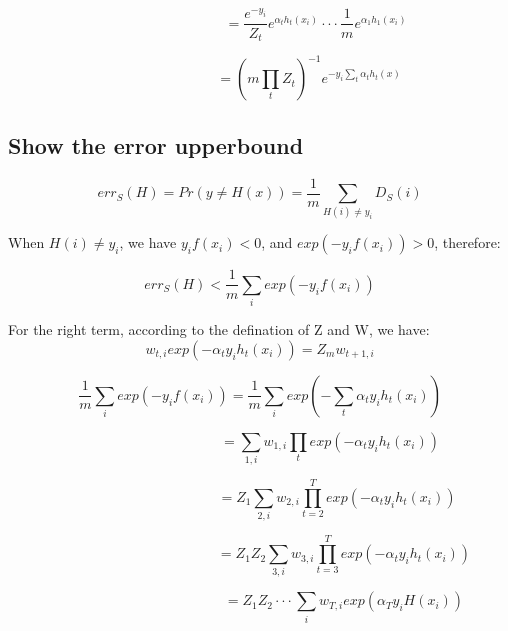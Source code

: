 \documentclass{article} %
\begin{document}
\begin{equation}
\qquad \qquad \qquad \qquad
= \frac{e^{-y_i}}{Z_t} e^{\alpha_t h_t (x_i)} \cdot \cdot \cdot
\frac{1}{m} e^{\alpha_1 h_1 (x_i)}
\end{equation}

\begin{equation}
\qquad \qquad \qquad \quad
= (m \prod_t Z_t)^{-1} e^{-y_i \sum_t \alpha_t h_t (x)}
\end{equation}


\subsection{Show the error upperbound}
\begin{equation}
err_S (H)= Pr (y \neq H (x)) =
\frac{1}{m} \sum_{H(i) \neq y_i} D_S (i)
\end{equation}

When $H(i) \neq y_i$, we have $y_i f(x_i) < 0$, and $exp(-y_i f(x_i)) > 0$,
therefore:

\begin{equation}
err_S (H) <
\frac{1}{m} \sum_i exp(-y_i f(x_i))
\end{equation}

For the right term, according to the defination of Z and W, we have:
\begin{equation}
w_{t,i} exp(-\alpha_t y_i h_t (x_i)) = Z_m w_{t+1,i}
\end{equation}

\begin{equation}
\frac{1}{m} \sum_i exp(-y_i f(x_i))
= \frac{1}{m} \sum_i exp (-\sum_t \alpha_t y_i h_t (x_i))
\end{equation}

\begin{equation}
\qquad \qquad \qquad \qquad \qquad
= \sum_{1,i} w_{1,i} \prod_t exp(-\alpha_t y_i h_t (x_i))
\end{equation}

\begin{equation}
\qquad \qquad \qquad \qquad \qquad \quad
= Z_1 \sum_{2,i} w_{2,i} \prod_{t=2}^T exp(-\alpha_t y_i h_t (x_i))
\end{equation}

\begin{equation}
\qquad \qquad \qquad \qquad \qquad \qquad
= Z_1 Z_2 \sum_{3,i} w_{3,i} \prod_{t=3}^T exp(-\alpha_t y_i h_t (x_i))
\end{equation}

\begin{equation}
\qquad \qquad \qquad \qquad \qquad \qquad
= Z_1 Z_2 \cdot \cdot \cdot \sum_i w_{T,i} exp(\alpha_T y_i H(x_i))
\end{equation}
\end{document}
